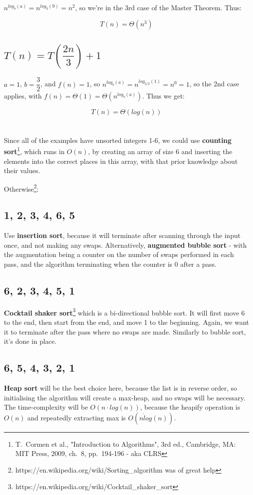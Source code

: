 \documentclass[tikz]{article}
\begin{document}
$n^{log_b(a)} = n^{log_3(9)} = n^2$, so we're in the 3rd case of the Master Theorem. Thus:

\[T(n) = \Theta(n^3)\]

\subsection{$T(n) = T(\dfrac{2n}{3}) + 1$}
$a = 1$, $b= \dfrac{3}{2}$, and $f(n)=1$, so $n^{log_b(a)} = n^{log_{3/2}(1)} = n^0 = 1$, so the 2nd case applies, with $f(n) = \Theta(1) = \Theta(n^{log_b(a)})$. Thus we get:

\[T(n) = \Theta(log(n))\]

\section{}
Since all of the examples have unsorted integers 1-6, we could use \textbf{counting sort}\footnote{T.~Cormen et al., "Introduction to Algorithms", 3rd ed., Cambridge, MA: MIT Press, 2009, ch.~8, pp.~194-196 - aka CLRS}, which runs in $O(n)$, by creating an array of size 6 and inserting the elements into the correct places in this array, with that prior knowledge about their values.

Otherwise\footnote{https://en.wikipedia.org/wiki/Sorting\_algorithm was of great help}:
\subsection{1, 2, 3, 4, 6, 5}
Use \textbf{insertion sort}, because it will terminate after scanning through the input once, and not making any swaps. Alternatively, \textbf{augmented bubble sort} - with the augmentation being a counter on the number of swaps performed in each pass, and the algorithm terminating when the counter is 0 after a pass.

\subsection{6, 2, 3, 4, 5, 1}
\textbf{Cocktail shaker sort}\footnote{https://en.wikipedia.org/wiki/Cocktail\_shaker\_sort} which is a bi-directional bubble sort. It will first move 6 to the end, then start from the end, and move 1 to the beginning. Again, we want it to terminate after the pass where no swaps are made. Similarly to bubble sort, it's done in place.

\subsection{6, 5, 4, 3, 2, 1}
\textbf{Heap sort} will be the best choice here, because the list is in reverse order, so initialising the algorithm will create a max-heap, and no swaps will be necessary. The time-complexity will be $O(n \cdot log(n))$, because the heapify operation is $O(n)$ and repeatedly extracting max is $O(n\dot log(n))$.
\end{document}
